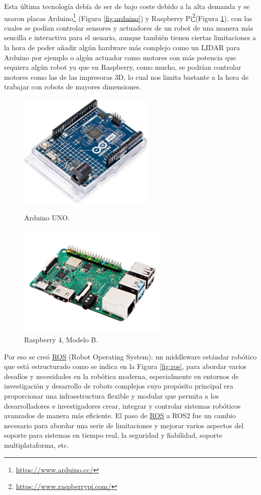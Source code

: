 Esta última tecnología debía de ser de bajo coste debido a la alta demanda y se usaron placas Arduino\footnote{\url{https://www.arduino.cc/}} (Figura \ref{fig:arduino}) y Raspberry Pi\footnote{\url{https://www.raspberrypi.com/}}(Figura \ref{fig:raspberry}), con las cuales se podían controlar sensores y actuadores de un robot de una manera más sencilla e interactiva para el usuario, aunque también tienen ciertas limitaciones a la hora de poder añadir algún hardware más complejo como un LIDAR para Arduino por ejemplo o algún actuador como motores con más potencia que requiera algún robot ya que en Raspberry, como mucho, se podrían controlar motores como las de las impresoras 3D, lo cual nos limita bastante a la hora de trabajar con robots de mayores dimensiones.


\begin{figure}[H]
  \begin{minipage}{0.48\textwidth}
    \centering
    \includegraphics[width=6.5cm]{figs/arduino_uno.jpg}
    \caption{Arduino UNO.}
    \label{fig:arduino}
  \end{minipage}
  \hfill
  \begin{minipage}{0.48\textwidth}
    \centering
    \includegraphics[width=7.2cm]{figs/raspberry4.png}
    \caption{Raspberry 4, Modelo B.} 
    \label{fig:raspberry}
  \end{minipage}
\end{figure}

Por eso se creó \hyperlink{ROS}{ROS} (Robot Operating System): un middleware estándar robótico que está estructurado como se indica en la Figura \ref{fig:ros}, para abordar varios desafíos y necesidades en la robótica moderna, especialmente en entornos de investigación y desarrollo de robots complejos cuyo propósito principal era proporcionar una infraestructura flexible y modular que permita a los desarrolladores e investigadores crear, integrar y controlar sistemas robóticos avanzados de manera más eficiente. El paso de \hyperlink{ROS}{ROS} a ROS2 fue un cambio necesario para abordar una serie de limitaciones y mejorar varios aspectos del soporte para sistemas en tiempo real, la seguridad y fiabilidad, soporte multiplataforma, etc.


